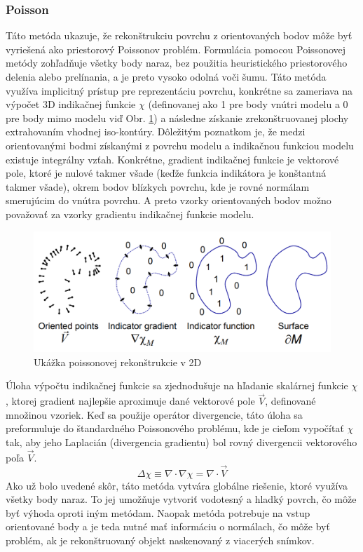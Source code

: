 \subsubsection{Poisson}
\noindent Táto metóda ukazuje, že rekonštrukciu povrchu z orientovaných bodov môže byť vyriešená ako priestorový Poissonov problém. Formulácia pomocou Poissonovej metódy zohľadňuje všetky body naraz, bez použitia heuristického priestorového delenia alebo prelínania, a je preto vysoko odolná voči šumu. \cite{poisson_origin}
\newline\indent Táto metóda využíva implicitný prístup pre reprezentáciu povrchu, konkrétne sa zameriava na výpočet 3D indikačnej funkcie $\chi$ (definovanej ako 1 pre body vnútri modelu a 0 pre body mimo modelu viď Obr. \ref{fig:poisson}) a následne získanie zrekonštruovanej plochy extrahovaním vhodnej iso-kontúry. Dôležitým poznatkom je, že medzi orientovanými bodmi získanými  z povrchu modelu a indikačnou funkciou  modelu existuje integrálny vzťah. Konkrétne, gradient indikačnej funkcie je vektorové pole, ktoré je nulové takmer všade (keďže funkcia indikátora je konštantná takmer všade), okrem bodov blízkych povrchu, kde je rovné normálam smerujúcim do vnútra povrchu. A preto vzorky orientovaných bodov možno považovať za vzorky gradientu indikačnej funkcie modelu. \cite{poisson_origin}
\begin{figure}[!htbp]
  \centering
  \includegraphics[width=14cm]{img/poisson.png}
  \caption{Ukážka poissonovej rekonštrukcie v 2D \cite{poisson_origin}} 
  \label{fig:poisson}
\end{figure} 
\newline\indent Úloha výpočtu indikačnej funkcie sa zjednodušuje na hľadanie skalárnej funkcie $\chi$, ktorej gradient najlepšie aproximuje dané vektorové pole $\vec{V}$, definované množinou vzoriek. Keď sa použije operátor divergencie, táto úloha sa preformuluje do štandardného Poissonového problému, kde je cieľom vypočítať $\chi$ tak, aby jeho Laplacián (divergencia gradientu) bol rovný divergencii vektorového poľa $\vec{V}$. \cite{poisson_origin}
\begin{equation}
    \Delta \chi \equiv \nabla \cdot \nabla \chi = \nabla \cdot \vec{V}
    \label{eq:poisson}
\end{equation}
\indent Ako už bolo uvedené skôr, táto metóda vytvára globálne riešenie, ktoré využíva všetky body naraz. To jej umožňuje vytvoriť vodotesný a hladký povrch, čo môže byť výhoda oproti iným metódam. Naopak metóda potrebuje na vstup orientované body a je teda nutné mať informáciu o normálach, čo môže byť problém, ak je rekonštruovaný objekt naskenovaný z viacerých snímkov.   

